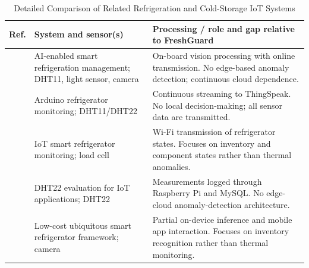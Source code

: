\documentclass[conference]{IEEEtran}
\begin{document}
\begin{table}[H]
\caption{Detailed Comparison of Related Refrigeration and Cold-Storage IoT Systems}
\label{tab:related}
\centering
\scriptsize
\renewcommand{\arraystretch}{1.1}
\begin{tabular}{@{}p{}p{}p{}@{}}
\toprule
Ref. & System and sensor(s) & Processing / role and gap relative to FreshGuard \\
\midrule
\cite{dong} & AI-enabled smart refrigeration management; DHT11, light sensor, camera & On-board vision processing with online transmission. No edge-based anomaly detection; continuous cloud dependence. \\
\cite{arduino} & Arduino refrigerator monitoring; DHT11/DHT22 & Continuous streaming to ThingSpeak. No local decision-making; all sensor data are transmitted. \\
\cite{loadcell} & IoT smart refrigerator monitoring; load cell & Wi-Fi transmission of refrigerator states. Focuses on inventory and component states rather than thermal anomalies. \\
\cite{ahmad} & DHT22 evaluation for IoT applications; DHT22 & Measurements logged through Raspberry Pi and MySQL. No edge-cloud anomaly-detection architecture. \\
\cite{smartfridge} & Low-cost ubiquitous smart refrigerator framework; camera & Partial on-device inference and mobile app interaction. Focuses on inventory recognition rather than thermal monitoring. \\
\bottomrule
\end{tabular}
\end{table}
\end{document}
